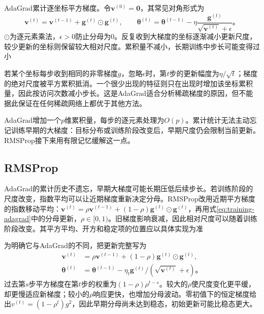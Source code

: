 AdaGrad累计逐坐标平方梯度。令$\bm v^{(0)}=\bm0$，其常见对角形式为
\begin{equation}
  \bm v^{(t)}=\bm v^{(t-1)}+\bm g^{(t)}\odot\bm g^{(t)},\qquad
  \bm\theta^{(t)}=\bm\theta^{(t-1)}-
  \eta\frac{\bm g^{(t)}}{\sqrt{\bm v^{(t)}}+\epsilon}\text{。}
  \label{eq:training-adagrad}
\end{equation}
$\odot$为逐元素乘法，$\epsilon>0$防止分母为0。反复收到大梯度的坐标逐渐减小更新尺度，较少更新的坐标则保留较大相对尺度。累积量不减小，长期训练中步长可能变得过小

若某个坐标每步收到相同的非零梯度$g$，忽略$\epsilon$时，第$t$步的更新幅度为$\eta/\sqrt t$；梯度的绝对尺度被平方累积抵消。一个很少出现的特征则只在出现时增加该坐标累积量，因此按访问次数减小步长。这是AdaGrad适合分析稀疏梯度的原因，但不能据此保证在任何稀疏网络上都优于其他方法。

AdaGrad增加一个$p$维累积量，每步的逐元素处理为$O(p)$。累计统计无法主动忘记训练早期的大梯度：目标分布或训练阶段改变后，早期尺度仍会限制当前更新。RMSProp接下来用有限记忆缓解这一点。

\subsection{RMSProp}
\label{sec:training-rmsprop}

AdaGrad的累计历史不遗忘，早期大梯度可能长期压低后续步长。若训练阶段的尺度改变，指数平均可以让近期梯度重新决定分母。RMSProp改用近期平方梯度的指数移动平均：$\bm v^{(t)}=\rho\bm v^{(t-1)}+(1-\rho)\bm g^{(t)}\odot\bm g^{(t)}$，再用式\eqref{eq:training-adagrad}中的分母更新，$\rho\in[0,1)$。旧梯度影响衰减，因此相对尺度可以随着训练阶段改变。其平方平均、开方和稳定项的位置应以具体实现为准

为明确它与AdaGrad的不同，把更新完整写为
\begin{equation}
  \begin{aligned}
  \bm v^{(t)}&=\rho\bm v^{(t-1)}+(1-\rho)\bm g^{(t)}\odot\bm g^{(t)},\\
  \bm\theta^{(t)}&=\bm\theta^{(t-1)}-
    \eta_t\bm g^{(t)}/(\sqrt{\bm v^{(t)}}+\epsilon)\text{。}
  \end{aligned}
  \label{eq:training-rmsprop}
\end{equation}
过去第$s$步平方梯度在第$t$步的权重为$(1-\rho)\rho^{t-s}$。较大的$\rho$使尺度变化更平缓，却更慢适应新梯度；较小的$\rho$响应更快，也增加分母波动。零初值下的恒定梯度给出$v^{(t)}=(1-\rho^t)g^2$，因此早期分母尚未达到稳态，初始更新可能比稳态更大。

